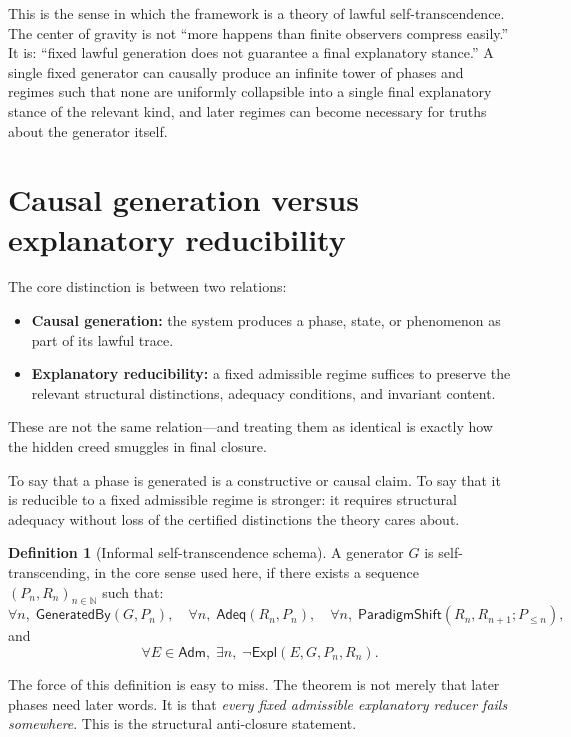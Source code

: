 \documentclass[11pt,a4paper]{article}
\theoremstyle{definition}
\newtheorem{definition}[theorem]{Definition}
\newcommand{\Expl}{\mathsf{Expl}}
\newcommand{\Adeq}{\mathsf{Adeq}}
\newcommand{\GeneratedBy}{\mathsf{GeneratedBy}}
\newcommand{\ParadigmShift}{\mathsf{ParadigmShift}}
\newcommand{\Admissible}{\mathsf{Adm}}
\begin{document}
This is the sense in which the framework is a theory of lawful self-transcendence. The center of gravity is not ``more happens than finite observers compress easily.'' It is: ``fixed lawful generation does not guarantee a final explanatory stance.'' A single fixed generator can causally produce an infinite tower of phases and regimes such that none are uniformly collapsible into a single final explanatory stance of the relevant kind, and later regimes can become necessary for truths about the generator itself.

\section{Causal generation versus explanatory reducibility}\label{sec:causal-vs-explanatory}

The core distinction is between two relations:

\begin{itemize}[leftmargin=2em]
\item \textbf{Causal generation:} the system produces a phase, state, or phenomenon as part of its lawful trace.
\item \textbf{Explanatory reducibility:} a fixed admissible regime suffices to preserve the relevant structural distinctions, adequacy conditions, and invariant content.
\end{itemize}

These are not the same relation---and treating them as identical is exactly how the hidden creed smuggles in final closure.

To say that a phase is generated is a constructive or causal claim. To say that it is reducible to a fixed admissible regime is stronger: it requires structural adequacy without loss of the certified distinctions the theory cares about.

\begin{definition}[Informal self-transcendence schema]
A generator $G$ is self-transcending, in the core sense used here, if there exists a sequence $(P_n,R_n)_{n\in\mathbb{N}}$ such that:
\[
\forall n,\; \GeneratedBy(G,P_n),
\quad
\forall n,\; \Adeq(R_n,P_n),
\quad
\forall n,\; \ParadigmShift(R_n,R_{n+1};P_{\le n}),
\]
and
\[
\forall E \in \Admissible,\; \exists n,\; \neg \Expl(E,G,P_n,R_n).
\]
\end{definition}

The force of this definition is easy to miss. The theorem is not merely that later phases need later words. It is that \emph{every fixed admissible explanatory reducer fails somewhere}. This is the structural anti-closure statement.
\end{document}
